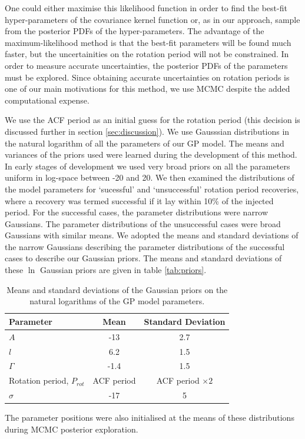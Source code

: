 \documentclass[useAMS, usenatbib, preprint, 12pt]{aastex}
\begin{document}
One could either maximise this likelihood function in order to find the
best-fit hyper-parameters of the covariance kernel function or, as in our
approach, sample from the posterior PDFs of the hyper-parameters.
The advantage of the maximum-likelihood method is that the best-fit parameters
will be found much faster, but the uncertainities on the rotation period
will not be constrained.
In order to measure accurate uncertainties, the posterior PDFs of the
parameters must be explored.
Since obtaining accurate uncertainties on rotation periods is one of our main
motivations for this method, we use MCMC despite the added computational
expense.

We use the ACF period as an initial guess for the rotation period (this
decision is discussed further in section \textsection \ref{sec:discussion}).
We use Gausssian distributions in the natural logarithm of all the parameters
of our GP model.
The means and variances of the priors used were learned during the development
of this method.
In early stages of development we used very broad priors on all the parameters
uniform in log-space between -20 and 20.
We then examined the distributions of the model parameters for `sucessful' and
`unsuccessful' rotation period recoveries, where a recovery was termed
successful if it lay within 10\% of the injected period.
For the successful cases, the parameter distributions were narrow Gaussians.
The parameter distributions of the unsuccessful cases were broad Gaussians
with similar means.
We adopted the means and standard deviations of the narrow Gaussians
describing the parameter distributions of the successful cases to describe our
Gaussian priors.
The means and standard deviations of these $\ln$ Gaussian priors are given in
table \ref{tab:priors}.

\begin{table}
\begin{center}
\caption{Means and standard deviations of the Gaussian priors on the natural
logarithms of the GP model parameters.}
\begin{tabular}{lcc}
Parameter & Mean & Standard Deviation \\
    \hline
    $A$ & -13 & 2.7 \\
    $l$ & 6.2 & 1.5 \\
    $\Gamma$ & -1.4 & 1.5 \\
    Rotation period, $P_{rot}$ & ACF period & ACF period $\times 2$ \\
    $\sigma$ & -17 & 5 \\
\end{tabular}
\end{center}
\end{table}
\label{tab:priors}
The parameter positions were also initialised at the means of these
distributions during MCMC posterior exploration.
\end{document}
